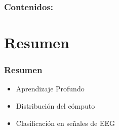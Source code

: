 
\begin{frame}[t,plain]
\titlepage
\end{frame}

\begin{frame}
	\frametitle{Contenidos:}
	
	\tableofcontents
\end{frame}

\section{Resumen}
\begin{frame}[t,fragile]
	\frametitle {Resumen}
	\begin{block}{}
		\begin{itemize}
			\item Aprendizaje Profundo
			\pause
			\item Distribuci\'on del c\'omputo
			\pause
			\item Clasificaci\'on en se\~nales de EEG
		\end{itemize}
	\end{block}
\end{frame}
